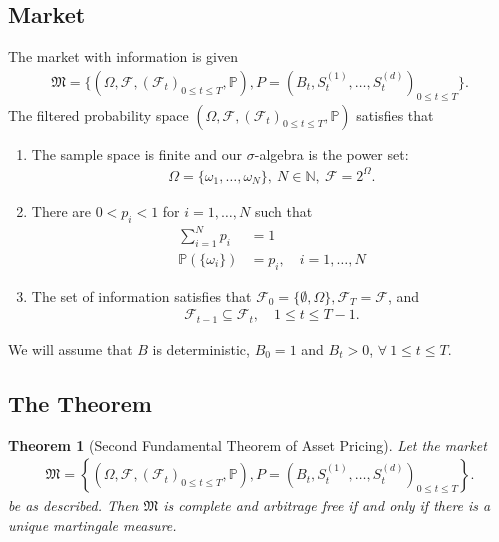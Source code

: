 \documentclass{article}
\newtheorem{theorem}{Theorem}[section]
\theoremstyle{definition}
\numberwithin{equation}{section}
\begin{document}
\subsection{Market}
The market with information is given
\begin{align*}
    \mathfrak{M} = \{ (\Omega, \mathscr{F}, (\mathscr{F}_t)_{0 \leq t \leq T}, \mathbb{P}), P = (B_t, S_t^{(1)}, \ldots, S_t^{(d)})_{0 \leq t \leq T} \}. 
\end{align*} 
The filtered probability space $(\Omega, \mathscr{F}, (\mathscr{F}_t)_{0 \leq t \leq T}, \mathbb{P})$ satisfies that 
\begin{enumerate}
    \item The sample space is finite and our $\sigma$-algebra is the power set: 
    \begin{align*}
       \Omega = \{ \omega_1, \ldots, \omega_N\}, \ N \in \mathbb{N}, \ \mathscr{F} = 2^{\Omega}.
    \end{align*}
    \item There are $0 < p_i < 1$ for $i = 1, \ldots, N$ such that 
    \begin{align*}
        \sum_{i=1}^N p_i &= 1\\
        \mathbb{P}(\{ \omega_i \}) &= p_i, \quad i = 1, \ldots, N
    \end{align*}
    \item The set of information satisfies that $\mathscr{F}_0 = \{ \emptyset, \Omega\}, \mathscr{F}_T = \mathscr{F}$, and 
    \begin{align*}
        \mathscr{F}_{t-1} \subseteq \mathscr{F}_t, \quad 1 \leq t \leq T-1. 
    \end{align*}
\end{enumerate}
We will assume that $B$ is deterministic, $B_0 = 1$ and $B_t > 0$, $\forall \ 1 \leq t \leq T$.

\subsection{The Theorem}
\begin{theorem}[Second Fundamental Theorem of Asset Pricing]
    Let the market 
    \begin{align*}
        \mathfrak{M} = \left\{ (\Omega, \mathscr{F}, (\mathscr{F}_t)_{0 \leq t \leq T}, \mathbb{P}), P = \left(B_t, S_t^{(1)}, \ldots, S_t^{(d)}\right)_{0 \leq t \leq T} \right\}. 
    \end{align*} 
    be as described. 
    Then $\mathfrak{M}$ is complete and arbitrage free if and only if there is a unique martingale measure.
\end{theorem}
\end{document}
